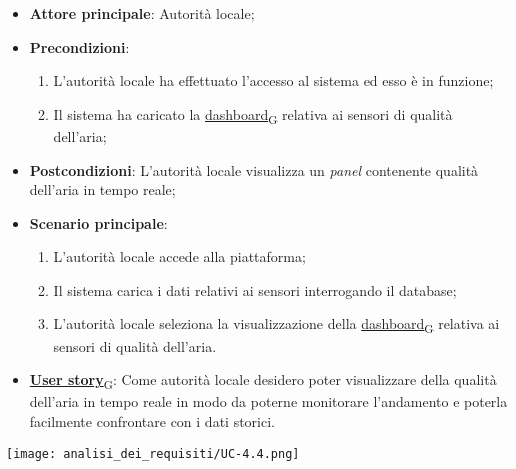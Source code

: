 \begin{itemize}
	\item \textbf{Attore principale}: Autorità locale;
	\item \textbf{Precondizioni}:
	      \begin{enumerate}
		      \item L'autorità locale ha effettuato l'accesso al sistema ed esso è in funzione;
		      \item Il sistema ha caricato la \href{https://7last.github.io/docs/rtb/documentazione-interna/glossario\#dashboard}{dashboard\textsubscript{G}} relativa ai sensori di qualità dell'aria;
	      \end{enumerate}
	\item \textbf{Postcondizioni}: L'autorità locale visualizza un \textit{panel} contenente qualità dell'aria in tempo reale;
	\item \textbf{Scenario principale}:
	      \begin{enumerate}
		      \item L'autorità locale accede alla piattaforma;
		      \item Il sistema carica i dati relativi ai sensori interrogando il database;
		      \item L'autorità locale seleziona la visualizzazione della \href{https://7last.github.io/docs/rtb/documentazione-interna/glossario\#dashboard}{dashboard\textsubscript{G}} relativa ai sensori di qualità dell'aria.
	      \end{enumerate}
	\item \href{https://7last.github.io/docs/rtb/documentazione-interna/glossario\#user-story}{\textbf{User story}\textsubscript{G}}:
	      Come autorità locale desidero poter visualizzare della qualità dell'aria in tempo reale in modo da poterne monitorare l'andamento
	      e poterla facilmente confrontare con i dati storici.
\end{itemize}
\begin{center}
	\texttt{[image: analisi\_dei\_requisiti/UC-4.4.png]}
\end{center}
